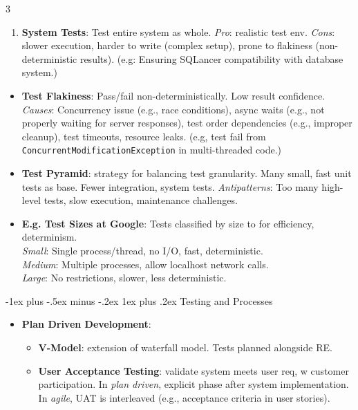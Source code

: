\documentclass[a4paper, 10pt, landscape]{article}
\makeatletter
\renewcommand{\subsubsection}{\@startsection{subsubsection}{3}{0mm}%
                                {-1ex plus -.5ex minus -.2ex}%
                                {1ex plus .2ex}%
                                {\normalfont\small\bfseries}}
\makeatother
\begin{document}
\begin{multicols*}{3}
\begin{enumerate}[leftmargin=2mm,labelindent=1mm,labelsep=1mm, itemsep = 0.5pt, before=\justifying]
    \item \textbf{System Tests}: Test entire system as whole. \textit{Pro}: realistic test env. \textit{Cons}: slower execution, harder to write  (complex setup), prone to flakiness (non-deterministic results). (e.g: Ensuring SQLancer compatibility with database system.)
\end{enumerate}
\begin{itemize}
    \item \textbf{Test Flakiness}: Pass/fail non-deterministically. Low result confidence. \\
    \textit{Causes}: Concurrency issue (e.g., race conditions), async waits (e.g., not properly waiting for server responses), test order dependencies (e.g., improper cleanup), test timeouts, resource leaks. (e.g, test fail from \texttt{ConcurrentModificationException} in multi-threaded code.)

    \item \textbf{Test Pyramid}: strategy for balancing test granularity. Many small, fast unit tests as base. Fewer integration, system tests.
	 \textit{Antipatterns}: Too many high-level tests, slow execution, maintenance challenges.
\end{itemize}
\begin{itemize}
    \item \textbf{E.g. Test Sizes at Google}: Tests classified by size to for efficiency, determinism. \\
     \textit{Small}: Single process/thread, no I/O, fast, deterministic. \\
      \textit{Medium}: Multiple processes, allow localhost network calls. \\
      \textit{Large}: No restrictions, slower, less deterministic.
\end{itemize}

\subsubsection{Testing and Processes}
\begin{itemize}
	\item \textbf{Plan Driven Development}:
\begin{itemize}
\item \textbf{V-Model}: extension of waterfall model. Tests planned alongside RE. 
    \item \textbf{User Acceptance Testing}: validate system meets user req, w customer participation. In \textit{plan driven}, explicit phase after system implementation. In \textit{agile}, UAT is interleaved (e.g., acceptance criteria in user stories).
\end{itemize}


\end{itemize}
\end{multicols*}
\end{document}
